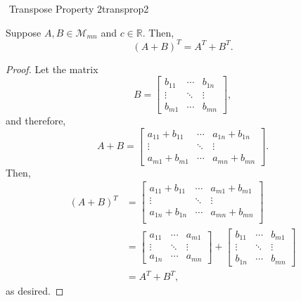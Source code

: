         \begin{theorem}{\Stop\,\,Transpose Property 2}{transprop2}
        
            Suppose \(A,B\in\mathcal{M}_{mn}\) and \(c\in\mathbb{R}\). Then,
            \begin{equation*}
                (A+B)^T=A^T+B^T.
            \end{equation*}
            \begin{proof}
                Let the matrix
                \begin{equation*}
                    B=\begin{bmatrix} b_{11} & \cdots & b_{1n} \\ \vdots & \ddots & \vdots \\
                    b_{m1} & \cdots & b_{mn} \end{bmatrix},
                \end{equation*}
                and therefore,
                \begin{equation*}
                    A+B=\begin{bmatrix} a_{11}+b_{11} & \cdots & a_{1n}+b_{1n} \\ \vdots & \ddots & \vdots \\
                    a_{m1}+b_{m1} & \cdots & a_{mn}+b_{mn} \end{bmatrix}.
                \end{equation*}
                Then,
                \begin{align*}
                    (A+B)^T&=\begin{bmatrix} a_{11}+b_{11} & \cdots & a_{m1}+b_{m1} \\ \vdots & \ddots & \vdots \\ a_{1n}+b_{1n} & \cdots & a_{mn}+b_{mn} \\
                    \end{bmatrix} \\
                    &=\begin{bmatrix} a_{11} & \cdots & a_{m1} \\
                    \vdots & \ddots & \vdots \\
                    a_{1n} & \cdots & a_{mn} \end{bmatrix}+\begin{bmatrix} b_{11} & \cdots & b_{m1} \\
                    \vdots & \ddots & \vdots \\
                    b_{1n} & \cdots & b_{mn} \end{bmatrix} \\
                    &=A^T+B^T,
                \end{align*}
                as desired.
            \end{proof}
        \end{theorem}
